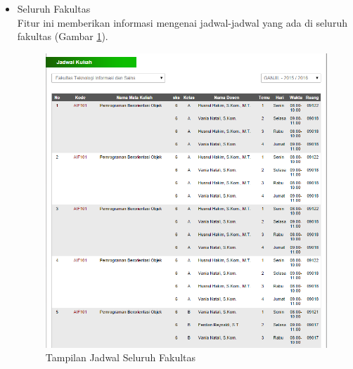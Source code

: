 \begin{enumerate}
\begin{itemize}
\begin{itemize}
			\item Seluruh Fakultas \\
			Fitur ini memberikan informasi mengenai jadwal-jadwal yang ada di seluruh fakultas (Gambar \ref{fig:3_pam_utama_jadwalall}).
			\begin{figure}[H]
				\centering
				\includegraphics[scale=0.5]{Gambar/pam-utama-jadwalall}
				\caption{Tampilan Jadwal Seluruh Fakultas} 
				\label{fig:3_pam_utama_jadwalall}
			\end{figure}
		\end{itemize}
		

\end{itemize}
\end{enumerate}
